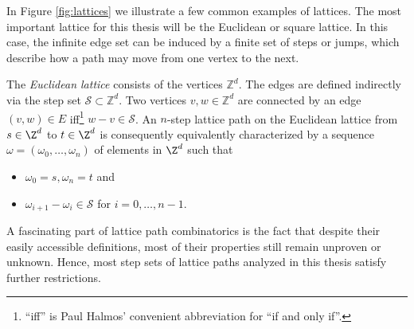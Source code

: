 In Figure \ref{fig:lattices} we illustrate a few common examples of lattices.
The most important lattice for this thesis will be the Euclidean or square lattice.
In this case, the infinite edge set can be induced by a finite set of steps or jumps, which describe how a path may move from one vertex to the next.

\begin{definition} 
  The \textit{Euclidean lattice} consists of the vertices $\mathbb{Z}^d$. The edges are defined indirectly via the step set $\mathcal{S} \subset \mathbb{Z}^d$. Two vertices $v, w \in \mathbb{Z}^d$ are connected by an edge $(v,w) \in E$ iff\footnote{``iff'' is Paul Halmos' convenient abbreviation for ``if and only if''.} $w - v \in \mathcal{S}$.
  An $n$-step lattice path on the Euclidean lattice from $s \in \Z^d$ to $t \in \Z^d$ is consequently equivalently characterized by a sequence $\omega = (\omega_0,\dots,\omega_n)$ of elements in $\Z^d$ such that
  \begin{itemize}
    \item $\omega_0 = s, \omega_n = t$ and
    \item $\omega_{i + 1} - \omega_i \in \mathcal{S}$ for $i = 0,\dots,n-1$.
  \end{itemize}
\end{definition}

A fascinating part of lattice path combinatorics is the fact that despite their easily accessible definitions, most of their properties still remain unproven or unknown. Hence, most step sets of lattice paths analyzed in this thesis satisfy further restrictions.

